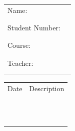 \documentclass[10pt]{article}
\begin{document}
\begin{tabular}{@{}p{1.5in}p{5in}}
Name: & \underline{\hspace{5in}} \\ \\ \\
Student Number: & \underline{\hspace{5in}} \\ \\ \\
Course: & \underline{\hspace{5in}} \\ \\ \\
Teacher: & \underline{\hspace{5in}} \\ \\ \\
\end{tabular}

\vspace{0.5in}

\begin{tabular}{@{}p{1.5in}p{5in}}
Date & Description \\ \\ \\
\underline{\hspace{1.5in}}& \underline{\hspace{5in}} \\
\\ \\
\underline{\hspace{1.5in}}& \underline{\hspace{5in}} \\
\\ \\
\underline{\hspace{1.5in}}& \underline{\hspace{5in}} \\
\\ \\
\underline{\hspace{1.5in}}& \underline{\hspace{5in}} \\
\end{tabular}
\vspace{3in}
\vspace*{\fill}
\end{document}
